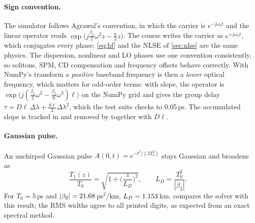 \paragraph{Sign convention.} The simulator follows Agrawal's convention, in which the carrier
is $e^{-j\omega_0t}$ and the linear operator reads $\exp\!\big(j\frac{\beta_2}{2}\omega^2z-\frac\alpha2z\big)$.
The course writes the carrier as $e^{+j\omega_0t}$, which conjugates every phase:
\cref{eq:hf} and the NLSE of \cref{sec:nlse} are the same physics. The dispersion, nonlinear and LO
phases use one convention consistently, so solitons, SPM, CD compensation and frequency offsets
behave correctly. With NumPy's transform a \emph{positive} baseband frequency is then a
\emph{lower} optical frequency, which matters for odd-order terms: with slope, the operator is
$\exp\!\big(j(\tfrac{\beta_2}{2}\omega^2-\tfrac{\beta_3}{6}\omega^3)\ell\big)$ on the NumPy grid and gives
the group delay $\tau=D\ell\,\Delta\lambda+\tfrac{S\ell}{2}\Delta\lambda^2$, which the test suite checks to
0.05\,ps. The accumulated slope is tracked in  and removed by
 together with $D\ell$.

\paragraph{Gaussian pulse.} An unchirped Gaussian pulse $A(0,t)=e^{-t^2/(2T_0^2)}$ stays Gaussian
and broadens as
\begin{equation}
  \frac{T_1(z)}{T_0}=\sqrt{1+\Big(\frac{z}{L_D}\Big)^2},\qquad L_D=\frac{T_0^2}{|\beta_2|}.
\end{equation}
For $T_0=5$\,ps and $|\beta_2|=21.68$\,ps$^2$/km, $L_D=1.153$\,km. 
compares the solver with this result; the RMS widths agree to all printed digits, as expected
from an exact spectral method.


